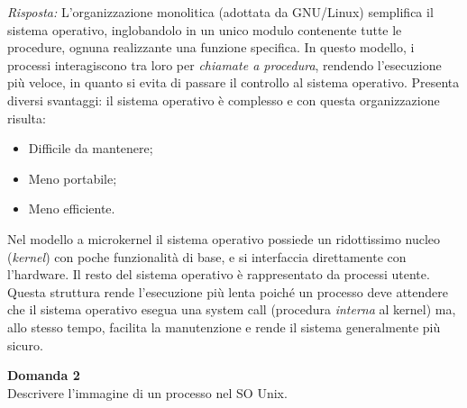 \documentclass{article}
\newenvironment{problem}[2][Domanda]
    { \begin{mdframed}[backgroundcolor=gray!20] \textbf{#1 #2} \\}
    {  \end{mdframed}}
\newenvironment{solution}
    {\textit{Risposta:}}
    {}
\begin{document}
\begin{solution}
L’organizzazione monolitica (adottata da GNU/Linux) semplifica il sistema operativo, inglobandolo in un unico modulo contenente tutte le procedure, ognuna realizzante una funzione specifica.
\newline
In questo modello, i processi interagiscono tra loro per \textit{chiamate a procedura}, rendendo l’esecuzione più veloce, in quanto si evita di passare il controllo al sistema operativo.
\newline
\newline
Presenta diversi svantaggi: il sistema operativo è complesso e con questa organizzazione risulta:
\begin{itemize}
    \item Difficile da mantenere;
    \item Meno portabile;
    \item Meno efficiente.
\end{itemize}
Nel modello a microkernel il sistema operativo possiede un ridottissimo nucleo (\textit{kernel}) con poche funzionalità di base, e si interfaccia direttamente con l’hardware.
\newline
Il resto del sistema operativo è rappresentato da processi utente.
\newline
Questa struttura rende l’esecuzione più lenta poiché un processo deve attendere che il sistema operativo esegua una system call (procedura \textit{interna} al kernel) ma, allo stesso tempo, facilita la manutenzione e rende il sistema generalmente più sicuro.
\end{solution}
\begin{problem}{2}
Descrivere l'immagine di un processo nel SO Unix. 
\end{problem}
\end{document}
